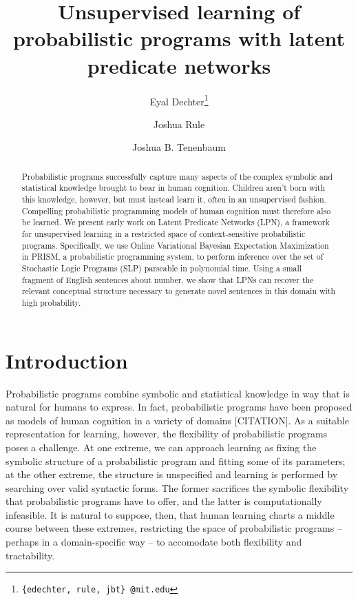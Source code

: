 \documentclass{article} %
\title{\vspace{-1.5cm} Unsupervised learning of probabilistic programs with latent predicate networks}
\author{Eyal Dechter\thanks{{\tt \{edechter, rule, jbt\} @mit.edu}}}
\author{Joshua Rule}
\author{Joshua B. Tenenbaum}
\affil{{\normalsize Department of Brain and Cognitive Sciences, MIT}}
\date{}
\begin{document}
\maketitle

\vspace{-1cm}
\begin{abstract}

  Probabilistic programs successfully capture many aspects of the
  complex symbolic and statistical knowledge brought to bear in human
  cognition. Children aren't born with this knowledge, however, but
  must instead learn it, often in an unsupervised fashion. Compelling
  probabilistic programming models of human cognition must therefore
  also be learned. We present early work on Latent Predicate Networks
  (LPN), a framework for unsupervised learning in a restricted space
  of context-sensitive probabilistic programs. Specifically, we use
  Online Variational Bayesian Expectation Maximization in
  PRISM, a probabilistic programming system, to perform inference over
  the set of Stochastic Logic Programs (SLP) parseable in polynomial
  time. Using a small fragment of English sentences about number, we
  show that LPNs can recover the relevant conceptual structure
  necessary to generate novel sentences in this domain with high
  probability.

\end{abstract}

\section{Introduction}


Probabilistic programs combine symbolic and statistical knowledge in way that is
natural for humans to express. In fact, probabilistic programs have
been proposed as models of human cognition in a variety of domains
[CITATION]. As a suitable representation for learning, however, the flexibility
of probabilistic programs poses a challenge. At one extreme, we can
approach learning as fixing the symbolic structure of a probabilistic
program and fitting some of its parameters; at the other extreme, the
structure is unspecified and learning is performed by searching over
valid syntactic forms. The former sacrifices the symbolic flexibility
that probabilistic programs have to offer, and the latter is
computationally infeasible. It is natural to suppose, then, that human
learning charts a middle course between these extremes, restricting
the space of probabilistic programs -- perhaps in a domain-specific
way -- to accomodate both flexibility and tractability.
\end{document}
